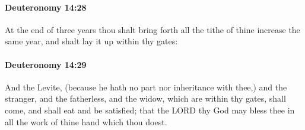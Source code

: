 		\paragraph{Deuteronomy 14:28} %
			\label{DEUTERONOMY-14-28}

			At the end of three years thou shalt bring forth all the tithe of thine increase the same year, and shalt lay it up within thy gates:


		\paragraph{Deuteronomy 14:29} %
			\label{DEUTERONOMY-14-29}

			And the Levite, (because he hath no part nor inheritance with thee,) and the stranger, and the fatherless, and the widow, which are within thy gates, shall come, and shall eat and be satisfied; that the LORD thy God may bless thee in all the work of thine hand which thou doest.

